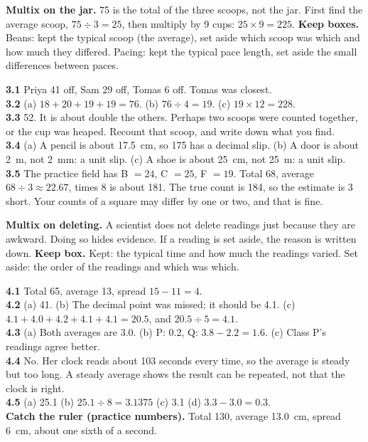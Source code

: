 \textbf{Multix on the jar.} 75 is the total of the three scoops, not the jar. First find the average scoop, $75\div3=25$, then multiply by 9 cups: $25\times9=225$. \textbf{Keep boxes.} Beans: kept the typical scoop (the average), set aside which scoop was which and how much they differed. Pacing: kept the typical pace length, set aside the small differences between paces.

\textbf{3.1} Priya 41 off, Sam 29 off, Tomas 6 off. Tomas was closest.\\
\textbf{3.2} (a) $18+20+19+19=76$. (b) $76\div4=19$. (c) $19\times12=228$.\\
\textbf{3.3} 52. It is about double the others. Perhaps two scoops were counted together, or the cup was heaped. Recount that scoop, and write down what you find.\\
\textbf{3.4} (a) A pencil is about 17.5~cm, so 175 has a decimal slip. (b) A door is about 2~m, not 2~mm: a unit slip. (c) A shoe is about 25~cm, not 25~m: a unit slip.\\
\textbf{3.5} The practice field has B $=24$, C $=25$, F $=19$. Total 68, average $68\div3\approx22.67$, times 8 is about 181. The true count is 184, so the estimate is 3 short. Your counts of a square may differ by one or two, and that is fine.

\textbf{Multix on deleting.} A scientist does not delete readings just because they are awkward. Doing so hides evidence. If a reading is set aside, the reason is written down. \textbf{Keep box.} Kept: the typical time and how much the readings varied. Set aside: the order of the readings and which was which.

\textbf{4.1} Total 65, average 13, spread $15-11=4$.\\
\textbf{4.2} (a) 41. (b) The decimal point was missed; it should be 4.1. (c) $4.1+4.0+4.2+4.1+4.1=20.5$, and $20.5\div5=4.1$.\\
\textbf{4.3} (a) Both averages are 3.0. (b) P: 0.2, Q: $3.8-2.2=1.6$. (c) Class P's readings agree better.\\
\textbf{4.4} No. Her clock reads about 103 seconds every time, so the average is steady but too long. A steady average shows the result can be repeated, not that the clock is right.\\
\textbf{4.5} (a) 25.1 (b) $25.1\div8=3.1375$ (c) 3.1 (d) $3.3-3.0=0.3$.\\
\textbf{Catch the ruler (practice numbers).} Total 130, average 13.0~cm, spread 6~cm, about one sixth of a second.


